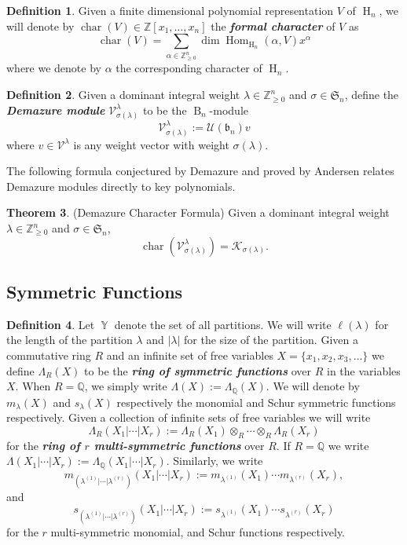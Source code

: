 \documentclass[12pt,reqno]{amsart}
\theoremstyle{definition}
\newtheorem{thm}{Theorem}[section]
\newtheorem{defn}[thm]{Definition}
\DeclareMathOperator{\Par}{\mathbb{Y}}
\DeclareMathOperator{\Dim}{\mathrm{dim}}
\DeclareMathOperator{\Hom}{\mathrm{Hom}}
\DeclareMathOperator{\Char}{\mathrm{char}}
\DeclareMathOperator{\bor}{\mathrm{B}}
\DeclareMathOperator{\tor}{\mathrm{H}}
\begin{document}
\begin{defn}
    Given a finite dimensional polynomial representation $V$ of $\tor_n$, we will denote by $\Char(V) \in \mathbb{Z}[x_1,\ldots,x_n]$ the \textbf{\textit{ formal character}} of $V$ as 
    $$\Char(V) = \sum_{\alpha \in \mathbb{Z}_{\geq 0}^{n}} \Dim \Hom_{\tor_n}(\alpha,V) x^{\alpha}$$ where we denote by $\alpha$ the corresponding character of $\tor_n.$
\end{defn}


\begin{defn}\cite{Dem_1974} \label{Demazure module defn}
    Given a dominant integral weight $\lambda \in \mathbb{Z}_{\geq 0}^{n}$ and $\sigma \in \mathfrak{S}_n$, define the \textbf{\textit{Demazure module}} $\mathcal{V}^{\lambda}_{\sigma(\lambda)}$ to be the $\bor_n$-module $$\mathcal{V}^{\lambda}_{\sigma(\lambda)}:= \mathcal{U}(\mathfrak{b}_n)v$$ where
    $v \in \mathcal{V}^{\lambda}$ is any weight vector with weight $\sigma(\lambda).$ 
\end{defn}


The following formula conjectured by Demazure \cite{Dem_1974} and proved by Andersen \cite{Andersen1985} relates Demazure modules directly to key polynomials.

\begin{thm}(Demazure Character Formula)\cite{Andersen1985} \label{Demazure Character Formula}
    Given a dominant integral weight $\lambda \in \mathbb{Z}_{\geq 0}^{n}$ and $\sigma \in \mathfrak{S}_n$,
    $$\Char(\mathcal{V}^{\lambda}_{\sigma(\lambda)}) = \mathcal{K}_{\sigma(\lambda)}.$$
\end{thm}





\subsection{Symmetric Functions}

\begin{defn}
    Let $\Par$ denote the set of all partitions. We will write $\ell(\lambda)$ for the length of the partition $\lambda$ and $|\lambda|$ for the size of the partition. Given a commutative ring $R$ and an infinite set of free variables $X = \{x_1,x_2,x_3,\ldots\}$ we define $\Lambda_R(X)$ to be the \textit{\textbf{ring of symmetric functions}} over $R$ in the variables $X.$ When $R= \mathbb{Q}$, we simply write $\Lambda(X):= \Lambda_{\mathbb{Q}}(X).$ We will denote by $m_{\lambda}(X)$ and $s_{\lambda}(X)$ respectively the monomial and Schur symmetric functions respectively. Given a collection of infinite sets of free variables we will write $$\Lambda_R(X_1|\cdots|X_r):=\Lambda_R(X_1)\otimes_R \cdots \otimes_R \Lambda_R(X_r)$$ for the \textit{\textbf{ring of $r$ multi-symmetric functions}} over $R$. If $R=\mathbb{Q}$ we write $\Lambda(X_1|\cdots|X_r):= \Lambda_{\mathbb{Q}}(X_1|\cdots | X_r).$ Similarly, we write $$m_{(\lambda^{(1)}|\cdots|\lambda^{(r)})}(X_1|\cdots|X_r):= m_{\lambda^{(1)}}(X_1)\cdots m_{\lambda^{(r)}}(X_r),$$
    and $$s_{(\lambda^{(1)}|\cdots|\lambda^{(r)})}(X_1|\cdots|X_r):= s_{\lambda^{(1)}}(X_1)\cdots s_{\lambda^{(r)}}(X_r)$$ for the $r$ multi-symmetric monomial, and Schur functions respectively.
\end{defn}
\end{document}
